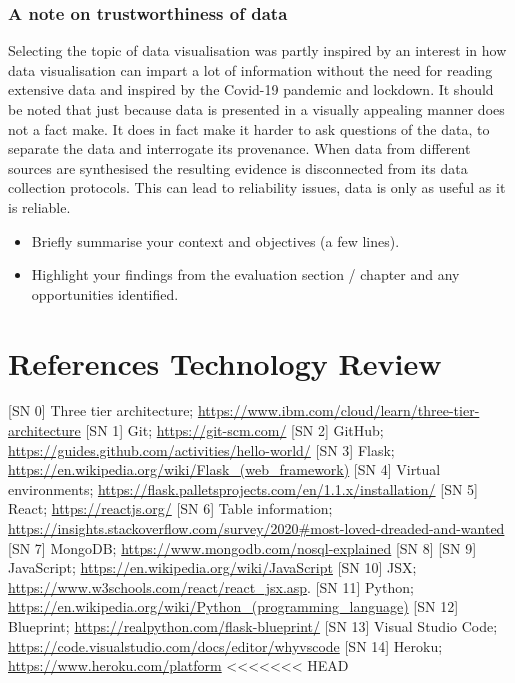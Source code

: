 \subsection{A note on trustworthiness of data}
Selecting the topic of data visualisation was partly inspired by an interest in how data visualisation can impart a lot of information without the need for reading extensive data and inspired by the Covid-19 pandemic and lockdown. It should be noted that just because data is presented in a visually appealing manner does not a fact make. It does in fact make it harder to ask questions of the data, to separate the data and interrogate its provenance. When data from different sources are synthesised the resulting evidence is disconnected from its data collection protocols. This can lead to reliability issues, data is only as useful as it is reliable. 









\begin{itemize}
\item Briefly summarise your context and objectives (a few lines).
\item Highlight your findings from the evaluation section / chapter and any opportunities identified.
\end{itemize}

\chapter{References Technology Review}
[SN 0] Three tier architecture; \url{https://www.ibm.com/cloud/learn/three-tier-architecture}
[SN 1] Git; \url{https://git-scm.com/}
[SN 2] GitHub; \url{https://guides.github.com/activities/hello-world/}
[SN 3] Flask; \url{https://en.wikipedia.org/wiki/Flask_(web_framework)}
[SN 4] Virtual environments; \url{https://flask.palletsprojects.com/en/1.1.x/installation/}
[SN 5] React;  \url{https://reactjs.org/}
[SN 6] Table information; \url{https://insights.stackoverflow.com/survey/2020#most-loved-dreaded-and-wanted}
[SN 7] MongoDB; \url{https://www.mongodb.com/nosql-explained}
[SN 8]
[SN 9] JavaScript; \url{https://en.wikipedia.org/wiki/JavaScript}
[SN 10] JSX; \url{https://www.w3schools.com/react/react_jsx.asp}.
[SN 11] Python; \url{https://en.wikipedia.org/wiki/Python_(programming_language)}
[SN 12] Blueprint; \url{https://realpython.com/flask-blueprint/}
[SN 13] Visual Studio Code; \url{https://code.visualstudio.com/docs/editor/whyvscode}
[SN 14] Heroku; \url{https://www.heroku.com/platform}
<<<<<<< HEAD


